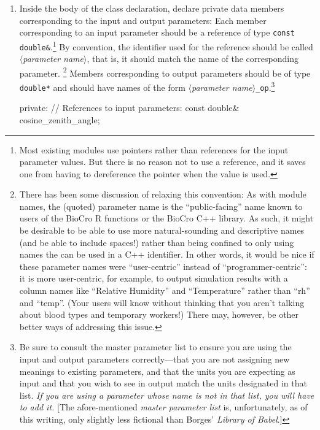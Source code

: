 \documentclass{article}\usepackage[]{graphicx}\usepackage[]{color}
\newcommand{\code}[1]{\lstinline[style=C++style]{#1}}
\newcommand{\placeholder}[1]{$\langle$\textrm{\textit{#1}}$\rangle$}
\begin{document}
\begin{enumerate}
\item Inside the body of the class declaration, declare private data
  members corresponding to the input and output parameters: Each
  member corresponding to an input parameter should be a reference of
  type \code{const double&}.\footnote{Most existing modules use
  pointers rather than references for the input parameter values.  But
  there is no reason not to use a reference, and it saves one from
  having to dereference the pointer when the value is used.}  By
  convention, the identifier used for the reference should be called
  \placeholder{parameter name}, that is, it should match the name of
  the corresponding parameter.%
  \footnote{There has been some discussion of relaxing this
    convention: As with module names, the (quoted) parameter name is
    the ``public-facing'' name known to users of the BioCro R
    functions or the BioCro C++ library.  As such, it might be
    desirable to be able to use more natural-sounding and descriptive
    names (and be able to include spaces!) rather than being confined
    to only using names the can be used in a C++ identifier.  In other
    words, it would be nice if these parameter names were
    ``user-centric'' instead of ``programmer-centric'': it is more
    user-centric, for example, to output simulation results with a
    column names like ``Relative Humidity'' and ``Temperature'' rather
    than ``rh'' and ``temp''.  (Your users will know without thinking
    that you aren't talking about blood types and temporary workers!)
    There may, however, be other better ways of addressing this
    issue.}
  Members corresponding to output parameters should be of type
  \code{double*} and should have names of the form
  \placeholder{parameter name}\code{_op}.\footnote{Be sure to consult
  the master parameter list to ensure you are using the input and
  output parameters correctly---that you are not assigning new
  meanings to existing parameters, and that the units you are
  expecting as input and that you wish to see in output match the
  units designated in that list.  \emph{If you are using a parameter
  whose name is not in that list, you will have to add it.}  [The
  afore-mentioned \emph{master parameter list} is, unfortunately, as
  of this writing, only slightly less fictional than Borges'
  \emph{Library of Babel}.]}

  \begin{example}[4]
    private:
       // References to input parameters:
       const double& cosine_zenith_angle;


\end{example}
\end{enumerate}
\end{document}

